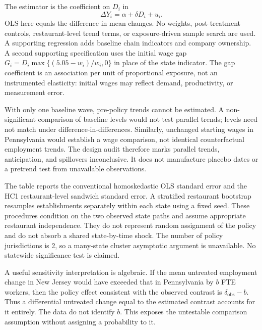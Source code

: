 \documentclass[11pt]{article}
\newcommand{\result}[2]{#2}
\begin{document}
The estimator is the coefficient on $D_i$ in
\begin{equation}
\Delta Y_i=\alpha+\delta D_i+u_i.
\label{eq:reg}
\end{equation}
OLS here equals the difference in mean changes. No weights, post-treatment controls, restaurant-level trend terms, or exposure-driven sample search are used. A supporting regression adds baseline chain indicators and company ownership. A second supporting specification uses the initial wage gap $G_i=D_i\max\{(5.05-w_i)/w_i,0\}$ in place of the state indicator. The gap coefficient is an association per unit of proportional exposure, not an instrumented elasticity: initial wages may reflect demand, productivity, or measurement error. %

With only one baseline wave, pre-policy trends cannot be estimated. A non-significant comparison of baseline levels would not test parallel trends; levels need not match under difference-in-differences. Similarly, unchanged starting wages in Pennsylvania would establish a wage comparison, not identical counterfactual employment trends. The design audit therefore marks parallel trends, anticipation, and spillovers inconclusive. It does not manufacture placebo dates or a pretrend test from unavailable observations. %

The table reports the conventional homoskedastic OLS standard error and the HC1 restaurant-level sandwich standard error. A stratified restaurant bootstrap resamples establishments separately within each state using a fixed seed. These procedures condition on the two observed state paths and assume appropriate restaurant independence. They do not represent random assignment of the policy and do not absorb a shared state-by-time shock. The number of policy jurisdictions is \result{audit.state_clusters}{2}, so a many-state cluster asymptotic argument is unavailable. No statewide significance test is claimed. %

A useful sensitivity interpretation is algebraic. If the mean untreated employment change in New Jersey would have exceeded that in Pennsylvania by $b$ FTE workers, then the policy effect consistent with the observed contrast is $\delta_{\mathrm{obs}}-b$. Thus a differential untreated change equal to the estimated contrast accounts for it entirely. The data do not identify $b$. This exposes the untestable comparison assumption without assigning a probability to it. %
\end{document}
